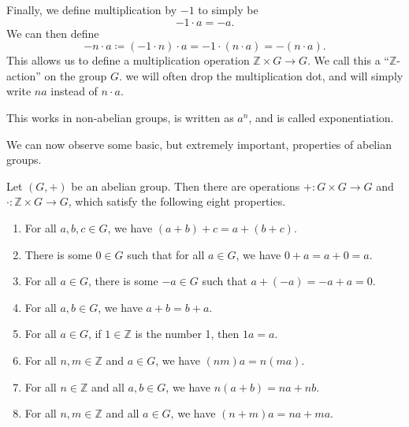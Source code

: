 Finally, we define multiplication by $-1$ to simply be
\[
	-1\cdot a = -a
.\]
We can then define
\[
	-n\cdot a\coloneqq (-1\cdot n)\cdot a=-1\cdot (n\cdot a)=-(n\cdot a)
.\]
This allows us to define a multiplication operation $\mathbb{Z} \times G\to G$. We call this a ``$\mathbb{Z} $-action'' on the group $G$. we will often drop the multiplication dot, and will simply write $na$ instead of $n\cdot a$.

\begin{remark}\label{rmk:exponentiation}
	This works in non-abelian groups, is written as $a^n$, and is called exponentiation.
\end{remark}

We can now observe some basic, but extremely important, properties of abelian groups.

\begin{proposition}\label{prp:Z-module}
	Let $(G,+)$ be an abelian group. Then there are operations $+: G\times G \to G$ and $\cdot : \mathbb{Z} \times G \to G$, which satisfy the following eight properties.
	\begin{enumerate}
		\item For all $a,b,c\in G$, we have $(a+b)+c=a+(b+c)$.
		\item There is some $0\in G$ such that for all $a\in G$, we have $0+a=a+0=a$.
		\item For all $a\in G$, there is some $-a\in G$ such that $a+(-a)=-a+a=0$.
		\item For all $a,b\in G$, we have $a+b=b+a$.
		\item For all $a\in G$, if $1\in\mathbb{Z} $ is the number 1, then $1a=a$.
		\item For all $n,m\in\mathbb{Z} $ and $a\in G$, we have $(nm)a=n(ma)$.
		\item For all $n\in\mathbb{Z} $ and all $a,b\in G$, we have $n(a+b)=na+nb$.
		\item For all $n,m\in\mathbb{Z} $ and all $a\in G$, we have $(n+m)a=na+ma$.
	\end{enumerate}
\end{proposition}
